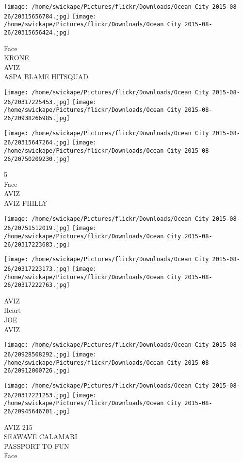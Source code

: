 \documentclass[10pt,letterpaper]{article}
\begin{document}
\texttt{[image: /home/swickape/Pictures/flickr/Downloads/Ocean City 2015-08-26/20315656784.jpg]}
\texttt{[image: /home/swickape/Pictures/flickr/Downloads/Ocean City 2015-08-26/20315656424.jpg]}

Face\\
KRONE\\
AVIZ\\
ASPA BLAME HITSQUAD
\pagebreak

\texttt{[image: /home/swickape/Pictures/flickr/Downloads/Ocean City 2015-08-26/20317225453.jpg]}
\texttt{[image: /home/swickape/Pictures/flickr/Downloads/Ocean City 2015-08-26/20938266985.jpg]}

\texttt{[image: /home/swickape/Pictures/flickr/Downloads/Ocean City 2015-08-26/20315647264.jpg]}
\texttt{[image: /home/swickape/Pictures/flickr/Downloads/Ocean City 2015-08-26/20750209230.jpg]}

5\\
Face\\
AVIZ\\
AVIZ PHILLY
\pagebreak

\texttt{[image: /home/swickape/Pictures/flickr/Downloads/Ocean City 2015-08-26/20751512019.jpg]}
\texttt{[image: /home/swickape/Pictures/flickr/Downloads/Ocean City 2015-08-26/20317223683.jpg]}

\texttt{[image: /home/swickape/Pictures/flickr/Downloads/Ocean City 2015-08-26/20317223173.jpg]}
\texttt{[image: /home/swickape/Pictures/flickr/Downloads/Ocean City 2015-08-26/20317222763.jpg]}

AVIZ\\
Heart\\
JOE\\
AVIZ
\pagebreak

\texttt{[image: /home/swickape/Pictures/flickr/Downloads/Ocean City 2015-08-26/20928508292.jpg]}
\texttt{[image: /home/swickape/Pictures/flickr/Downloads/Ocean City 2015-08-26/20912000726.jpg]}

\texttt{[image: /home/swickape/Pictures/flickr/Downloads/Ocean City 2015-08-26/20317221253.jpg]}
\texttt{[image: /home/swickape/Pictures/flickr/Downloads/Ocean City 2015-08-26/20945646701.jpg]}

AVIZ 215\\
SEAWAVE CALAMARI\\
PASSPORT TO FUN\\
Face
\pagebreak
\end{document}
